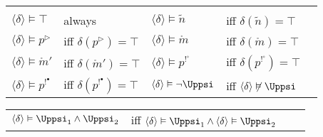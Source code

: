 \noindent
\begin{tabular}{m{1.3cm}lm{1.5cm}m{2.5cm}l}
  &&&\\
  $\langle \delta \rangle \vDash \top $&always&
  $\langle \delta \rangle \vDash \tilde{n} $& iff  $\delta(\tilde{n})=\top$ \\
  $\langle \delta \rangle \vDash p^\triangleright$& iff $\delta(p^\triangleright)=\top$&
  $\langle \delta \rangle \vDash \mathring{m}$& iff $\delta(\mathring{m})=\top$\\
  $\langle \delta \rangle \vDash \mathring{m}'$&iff $\delta(\mathring{m}')=\top$&
  $\langle \delta \rangle \vDash p^{!^\circ}$&iff $\delta(p^{!^\circ})=\top$\\
  $\langle \delta \rangle \vDash p^{!^\bullet}$&iff $\delta(p^{!^\bullet})=\top$&
   $\langle \delta \rangle \vDash \neg \Uppsi$ & iff $\langle \delta \rangle \not \vDash \Uppsi$
%  
\end{tabular} 
\noindent
\begin{tabular}{m{1.8cm}lm{2.5cm}l}
$\langle \delta \rangle \vDash \Uppsi_1 \wedge \Uppsi_2$&iff $\langle \delta \rangle \vDash \Uppsi_1 \wedge \langle \delta \rangle \vDash \Uppsi_2$ \\
\end{tabular} 

